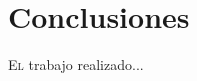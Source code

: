 \chapter{Conclusiones}
\label{chap:conclusiones}
\vspace{0.5cm}


 \lettrine{E}{l} trabajo realizado...
